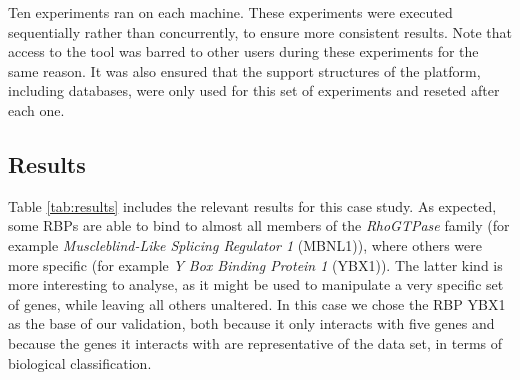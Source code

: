 Ten experiments ran on each machine. These experiments were executed
sequentially rather than concurrently, to ensure more consistent results. Note
that access to the tool was barred to other users during these experiments for
the same reason. It was also ensured that the support structures of the
platform, including databases, were only used for this set of experiments and
reseted after each one.

\subsection{Results}

Table \ref{tab:results} includes the relevant results for this case study. As
expected, some RBPs are able to bind to almost all members of the
\emph{RhoGTPase} family (for example \emph{Muscleblind-Like Splicing Regulator
1} (MBNL1)), where others were more specific (for example \emph{Y Box Binding
Protein 1} (YBX1)). The latter kind is more interesting to analyse, as it might
be used to manipulate a very specific set of genes, while leaving all others
unaltered. In this case we chose the RBP YBX1 as the base of our validation,
both because it only interacts with five genes and because the genes it
interacts with are representative of the data set, in terms of biological
classification.

